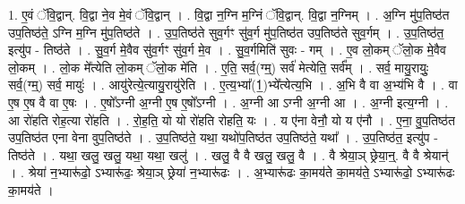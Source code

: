 \documentclass[17pt]{extarticle}
\begin{document}
1. ए॒वं ॅवि॒द्वान्. वि॒द्वा ने॒व मे॒वं ॅवि॒द्वान् । . वि॒द्वा न॒ग्नि म॒ग्निं ॅवि॒द्वान्. वि॒द्वा न॒ग्निम् । . अ॒ग्नि मु॑प॒तिष्ठ॑त उप॒तिष्ठ॑ते॒ ऽग्नि म॒ग्नि मु॑प॒तिष्ठ॑ते । . उ॒प॒तिष्ठ॑ते सुव॒र्गꣳ सु॑व॒र्ग मु॑प॒तिष्ठ॑त उप॒तिष्ठ॑ते सुव॒र्गम् । . उ॒प॒तिष्ठ॑त॒ इत्यु॑प - तिष्ठ॑ते । . सु॒व॒र्ग मे॒वैव सु॑व॒र्गꣳ सु॑व॒र्ग मे॒व । . सु॒व॒र्गमिति॑ सुवः - गम् । . ए॒व लो॒कम् ॅलो॒क मे॒वैव लो॒कम् । . लो॒क मे᳚त्येति लो॒कम् ॅलो॒क मे॑ति । . ए॒ति॒ सर्व॒(ग्म्॒) सर्व॑ मेत्येति॒ सर्व᳚म् । . सर्व॒ मायु॒रायुः॒ सर्व॒(ग्म्॒) सर्व॒ मायुः॑ । . आयु॑रेत्ये॒त्यायु॒रायु॑रेति । . ए॒त्य॒भ्या᳚(1॒)भ्ये᳚त्येत्य॒भि । . अ॒भि वै वा अ॒भ्य॑भि वै । . वा ए॒ष ए॒ष वै वा ए॒षः । . ए॒षो᳚ऽग्नी अ॒ग्नी ए॒ष ए॒षो᳚ऽग्नी । . अ॒ग्नी आ ऽग्नी अ॒ग्नी आ । . अ॒ग्नी इत्य॒ग्नी । . आ रो॑हति रोह॒त्या रो॑हति । . रो॒ह॒ति॒ यो यो रो॑हति रोहति॒ यः । . य ए॑ना वेनौ॒ यो य ए॑नौ । . ए॒ना॒ वु॒प॒तिष्ठ॑त उप॒तिष्ठ॑त एना वेना वुप॒तिष्ठ॑ते । . उ॒प॒तिष्ठ॑ते॒ यथा॒ यथो॑प॒तिष्ठ॑त उप॒तिष्ठ॑ते॒ यथा᳚ । . उ॒प॒तिष्ठ॑त॒ इत्यु॑प - तिष्ठ॑ते । . यथा॒ खलु॒ खलु॒ यथा॒ यथा॒ खलु॑ । . खलु॒ वै वै खलु॒ खलु॒ वै । . वै श्रेया॒ञ् छ्रेया॒न्॒. वै वै श्रेयान्॑ । . श्रेया॑ न॒भ्यारू॑ढो॒ ऽभ्यारू॑ढः॒ श्रेया॒ञ् छ्रेया॑ न॒भ्यारू॑ढः । . अ॒भ्यारू॑ढः का॒मय॑ते का॒मय॑ते॒ ऽभ्यारू॑ढो॒ ऽभ्यारू॑ढः का॒मय॑ते । \newline
\end{document}
